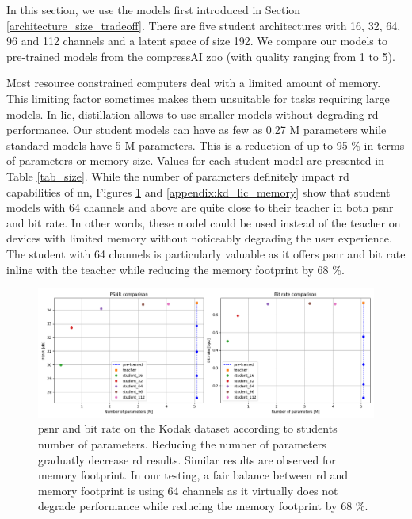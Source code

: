 In this section, we use the models first introduced in Section \ref{architecture_size_tradeoff}. There are five student architectures with 16, 32, 64, 96 and 112 channels and a latent space of size 192. We compare our models to pre-trained models from the compressAI zoo (with \textsf{quality} ranging from 1 to 5).

Most resource constrained computers deal with a limited amount of memory. This limiting factor sometimes makes them unsuitable for tasks requiring large models. In \acrshort{lic}, distillation allows to use smaller models without degrading \acrshort{rd} performance. Our student models can have as few as 0.27 M parameters while standard models have 5 M parameters. This is a reduction of up to 95 \% in terms of parameters or memory size. Values for each student model are presented in Table \ref{tab_size}. While the number of parameters definitely impact \acrshort{rd} capabilities of \acrshort{nn}, Figures \ref{kd_lic_parameters} and \ref{appendix:kd_lic_memory} show that student models with 64 channels and above are quite close to their teacher in both \acrshort{psnr} and bit rate. In other words, these model could be used instead of the teacher on devices with limited memory without noticeably degrading the user experience. The student with 64 channels is particularly valuable as it offers \acrshort{psnr} and bit rate inline with the teacher while reducing the memory footprint by 68 \%.

\begin{figure}
    \centering
    \includegraphics[width=15cm]{../img/kd_lic_parameters.png}
    \caption[\acrshort{psnr} and bit rate on the Kodak dataset according to students number of parameters.]{\acrshort{psnr} and bit rate on the Kodak dataset according to students number of parameters. Reducing the number of parameters graduatly decrease \acrshort{rd} results. Similar results are observed for memory footprint. In our testing, a fair balance between \acrshort{rd} and memory footprint is using 64 channels as it virtually does not degrade performance while reducing the memory footprint by 68 \%.}
    \label{kd_lic_parameters}
\end{figure}

